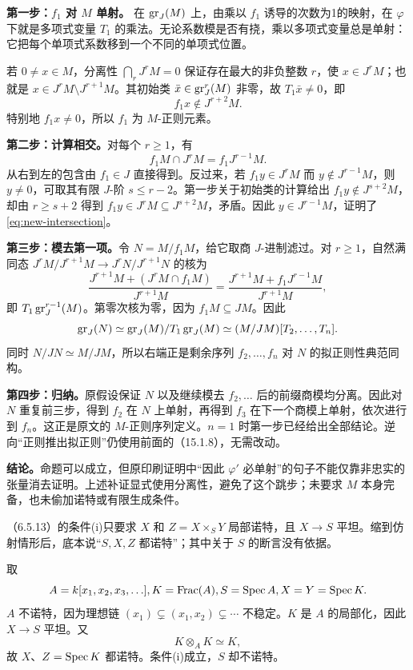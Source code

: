 \textbf{第一步：$f_1$ 对 $M$ 单射。}
在 $\operatorname{gr}_J(M)$ 上，由乘以 $f_1$ 诱导的次数为1的映射，在 $\varphi$ 下就是多项式变量 $T_1$ 的乘法。无论系数模是否有挠，乘以多项式变量总是单射：它把每个单项式系数移到一个不同的单项式位置。

若 $0\ne x\in M$，分离性 $\bigcap_rJ^rM=0$ 保证存在最大的非负整数 $r$，使 $x\in J^rM$；也就是
$x\in J^rM\setminus J^{r+1}M$。其初始类 $\bar x\in\operatorname{gr}_J^r(M)$ 非零，故 $T_1\bar x\ne0$，即
\[
 f_1x\notin J^{r+2}M.
\]
特别地 $f_1x\ne0$，所以 $f_1$ 为 $M$-正则元素。

\textbf{第二步：计算相交。}对每个 $r\geq1$，有
\begin{equation}\label{eq:new-intersection}
 f_1M\cap J^rM=f_1J^{r-1}M.
\end{equation}
从右到左的包含由 $f_1\in J$ 直接得到。反过来，若 $f_1y\in J^rM$ 而 $y\notin J^{r-1}M$，则 $y\ne0$，可取其有限 $J$-阶 $s\leq r-2$。第一步关于初始类的计算给出 $f_1y\notin J^{s+2}M$，却由 $r\geq s+2$ 得到 $f_1y\in J^rM\subseteq J^{s+2}M$，矛盾。因此 $y\in J^{r-1}M$，证明了\eqref{eq:new-intersection}。

\textbf{第三步：模去第一项。}令 $N=M/f_1M$，给它取商 $J$-进制滤过。对 $r\geq1$，自然满同态
$J^rM/J^{r+1}M\to J^rN/J^{r+1}N$ 的核为
\[
 \frac{J^{r+1}M+(J^rM\cap f_1M)}{J^{r+1}M}
 =\frac{J^{r+1}M+f_1J^{r-1}M}{J^{r+1}M},
\]
即 $T_1\operatorname{gr}_J^{r-1}(M)$。第零次核为零，因为 $f_1M\subseteq JM$。因此
\[
 \operatorname{gr}_J(N)\simeq\operatorname{gr}_J(M)/T_1\operatorname{gr}_J(M)
 \simeq(M/JM)[T_2,\ldots,T_n].
\]
同时 $N/JN\simeq M/JM$，所以右端正是剩余序列 $f_2,\ldots,f_n$ 对 $N$ 的拟正则性典范同构。

\textbf{第四步：归纳。}原假设保证 $N$ 以及继续模去 $f_2,\ldots$ 后的前缀商模均分离。因此对 $N$ 重复前三步，得到 $f_2$ 在 $N$ 上单射，再得到 $f_3$ 在下一个商模上单射，依次进行到 $f_n$。这正是原文的 $M$-正则序列定义。$n=1$ 时第一步已经给出全部结论。逆向“正则推出拟正则”仍使用前面的（15.1.8），无需改动。

\textbf{结论。}命题可以成立，但原印刷证明中“因此 $\varphi'$ 必单射”的句子不能仅靠非忠实的张量消去证明。上述补证显式使用分离性，避免了这个跳步；未要求 $M$ 本身完备，也未偷加诺特或有限生成条件。

（6.5.13）的条件(i)只要求 $X$ 和 $Z=X\times_SY$ 局部诺特，且 $X\to S$ 平坦。缩到仿射情形后，底本说“$S,X,Z$ 都诺特”；其中关于 $S$ 的断言没有依据。

取
\[
 A=k[x_1,x_2,x_3,\ldots], K=\operatorname{Frac}(A),
 S=\operatorname{Spec} A, X=Y=\operatorname{Spec} K.
\]
$A$ 不诺特，因为理想链 $(x_1)\subsetneq(x_1,x_2)\subsetneq\cdots$ 不稳定。$K$ 是 $A$ 的局部化，因此 $X\to S$ 平坦。又
\[
 K\otimes_AK\simeq K,
\]
故 $X$、$Z=\operatorname{Spec} K$ 都诺特。条件(i)成立，$S$ 却不诺特。

